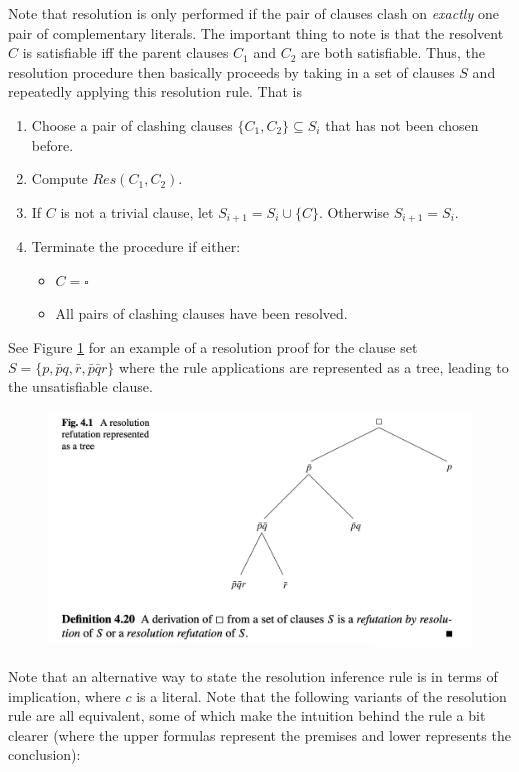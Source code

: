 \documentclass[10pt]{article}
\begin{document}
Note that resolution is only performed if the pair of clauses clash on \textit{exactly} one pair of complementary literals. The important thing to note is that the resolvent $C$ is satisfiable iff the parent clauses $C_1$ and $C_2$ are both satisfiable. Thus, the resolution procedure then basically proceeds by taking in a set of clauses $S$ and repeatedly applying this resolution rule. That is
\begin{enumerate}
    \item Choose a pair of clashing clauses $\{C_1,C_2\} \subseteq S_i$ that has not been chosen before.
    \item Compute $Res(C_1,C_2)$.
    \item If $C$ is not a trivial clause, let $S_{i+1}=S_i \cup \{C\}$. Otherwise $S_{i+1}=S_i$.
    \item Terminate the procedure if either:
    \begin{itemize}
        \item $C=\square$
        \item All pairs of clashing clauses have been resolved.
    \end{itemize}
\end{enumerate}
See Figure \ref{fig:resolution-refutation-tree} for an example of a resolution proof for the clause set $S=\{p,\bar{p}q, \bar{r}, \bar{p} \bar{q}r\}$ where the rule applications are represented as a tree, leading to the unsatisfiable clause.
\begin{figure}
    \centering
    \includegraphics[scale=0.25]{figures/refutation-example.png}
    \label{fig:resolution-refutation-tree}
\end{figure}

Note that an alternative way to state the resolution inference rule is in terms of implication, where $c$ is a literal. Note that the following variants of the resolution rule are all equivalent, some of which make the intuition behind the rule a bit clearer (where the upper formulas represent the premises and lower represents the conclusion):
\end{document}
